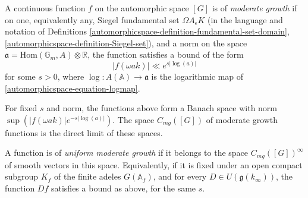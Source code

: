 \begin{definition}
 \label{definition-moderate-growth}
A continuous function $f$ on the automorphic space $[G]$ is of \emph{moderate growth} if on one, equivalently any, Siegel fundamental set  $\Omega A_\epsilon K$ (in the language and notation of Definitions \ref{automorphicspace-definition-fundamental-set-domain}, \ref{automorphicspace-definition-Siegel-set}), and a norm on the space $\mathfrak a = \text{Hom}(\mathbb G_m, A)\otimes \mathbb R$, the function satisfies a bound of the form
$$ |f(\omega a k)| \ll e^{s|\log(a)|}$$
for some $s>0$, where $\log: A(\mathbb A)\to \mathfrak a$ is the logarithmic map of \eqref{automorphicspace-equation-logmap}. 

For fixed $s$ and norm, the functions above form a Banach space with norm $\sup (|f(\omega a k)| e^{-s|\log(a)|})$. The space $C_{mg}([G])$ of moderate growth functions is the direct limit of these spaces. 

A function is of \emph{uniform moderate growth} if it belongs to the space $C_{mg}([G])^\infty$ of smooth vectors in this space. Equivalently, if it is fixed under an open compact subgroup $K_f$ of the finite adeles $G(\mathbb A_f)$, and for every $D\in U(\mathfrak g(k_\infty))$, the function $Df$ satisfies a bound as above, for the same $s$.
\end{definition}


